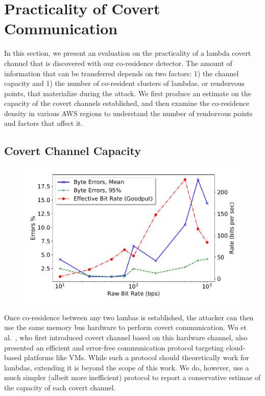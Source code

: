\section{Practicality of Covert Communication}
\label{sec:study}

In this section, we present an evaluation on the practicality of a lambda covert
channel that is discovered with our co-residence detector.  The amount of
information that can be transferred depends on two factors: 1) the channel
capacity and 1) the number of co-resident clusters of lambdas, or rendezvous
points, that materialize during the attack.  We first produce an estimate on the
capacity of the covert channels established, and then examine the co-residence
density in various AWS regions to understand the number of rendezvous points and
factors that affect it.

\subsection{Covert Channel Capacity}

\begin{figure}[!t]
  \includegraphics[width=.99\linewidth]{fig/channel_rate_3gb.pdf}
  \caption{
\label{fig:channel}}
\end{figure}

Once co-residence between any two lambas is established, the attacker can then
use the same memory bus hardware to perform covert communication. Wu et
al.~\cite{wuusenix2012}, who first introduced covert channel based on this
hardware channel, also presented an efficient and error-free communication
protocol targeting cloud-based platforms like VMs.  While such a protocol should
theoretically work for lambdas, extending it is beyond the scope of this work.
We do, however, use a much simpler (albeit more inefficient) protocol to report
a conservative estimae of the capacity of each covert channel.

